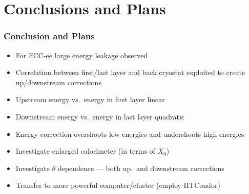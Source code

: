 \documentclass{beamer}
\newcommand{\backupbegin}{%
   \newcounter{finalframe}
   \setcounter{finalframe}{\value{framenumber}}
}
\newcommand{\backupend}{%
   \setcounter{framenumber}{\value{finalframe}}
}
\newcommand{\redtext}[1]{%
  \textcolor{myRed}{#1}
}
\begin{document}
\section{Conclusions and Plans}

\begin{frame}
  \frametitle{Conclusion and Plans}

  \begin{itemize}
    \item For FCC-ee large energy leakage observed
    \item Correlation between first/last layer and back cryostat exploited to create
          up/downstream corrections
    \item \redtext{Upstream} energy vs.\ energy in first layer \redtext{linear}
    \item \redtext{Downstream} energy vs.\ energy in last layer
          \redtext{quadratic}
    \item Energy correction overshoots low energies and undershoots high
          energies
    \item Investigate enlarged calorimeter (in terms of $X_{0}$)
    \item Investigate $\theta$ dependence --- both up.\ and downstream
          corrections
    \item Transfer to more powerful computer/cluster (employ HTCondor)
  \end{itemize}
\end{frame}


%
%
\end{document}
